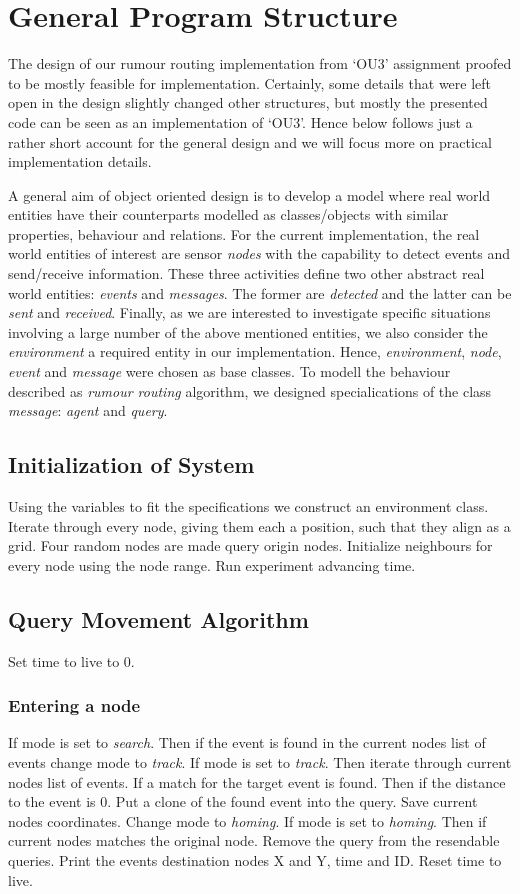 \documentclass[a4paper,11pt,twoside]{article}
\begin{document}
\section{General Program Structure}
The design of our rumour routing implementation from `OU3' assignment
proofed to be mostly feasible for implementation. Certainly, some
details that were left open in the design slightly changed other
structures, but mostly the presented code can be seen as
an implementation of `OU3'. Hence below follows just a rather short
account for the general design and we will focus more on practical
implementation details.

A general aim of object oriented design is to develop a model where
real world entities have their counterparts modelled as classes/objects
with similar properties, behaviour and relations. For the current
implementation, the real world entities of interest are sensor
\textit{nodes} with the capability to detect events and send/receive
information. These three activities define two other abstract real
world entities: \textit{events} and \textit{messages}. The former are
\textit{detected} and the latter can be \textit{sent} and \textit{received}. 
Finally, as we are interested to investigate specific
situations involving a large number of the above mentioned entities,
we also consider the \textit{environment} a required entity in our
implementation. Hence, \textit{environment}, \textit{node},
\textit{event} and \textit{message} were chosen as base
classes. To modell the behaviour described as \textit{rumour routing}
algorithm, we designed specialications of the class \textit{message}:
\textit{agent} and \textit{query}.

\subsection{Initialization of System}
Using the variables to fit the specifications we construct an
environment class. Iterate through every node, giving them each a
position, such that they align as a grid. Four random nodes are made
query origin nodes. Initialize neighbours for every node using the
node range. Run experiment advancing time.

\subsection{Query Movement Algorithm}
Set time to live to 0.

\subsubsection{Entering a node}
If mode is set to \textit{search}. Then if the event is found in the
current nodes list of events change mode to \textit{track}. If mode is
set to \textit{track}. Then iterate through current nodes list of
events. If a match for the target event is found. Then if the distance
to the event is 0. Put a clone of the found event into the query. Save
current nodes coordinates.  Change mode to \textit{homing}. If mode is
set to \textit{homing}. Then if current nodes matches the original
node. Remove the query from the resendable queries. Print the events
destination nodes X and Y, time and ID. Reset time to live.
\end{document}
